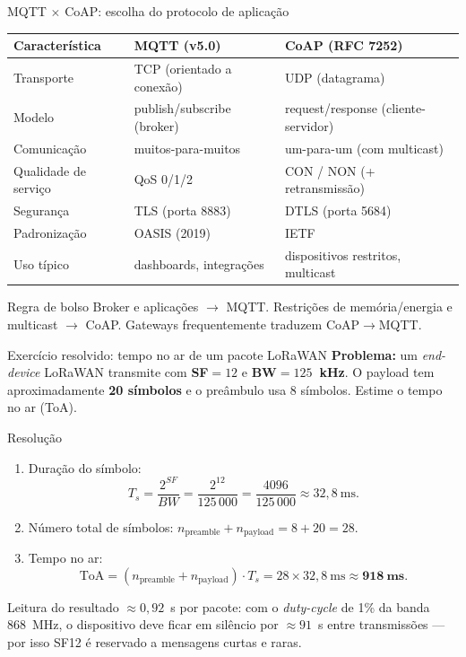 \documentclass[aspectratio=169,11pt]{beamer}
\begin{document}
\begin{frame}{MQTT $\times$ CoAP: escolha do protocolo de aplicação}
  \begin{center}
    \scriptsize
    \setlength{\tabcolsep}{4pt}
    \renewcommand{\arraystretch}{1.3}
    \begin{tabular}{p{3.2cm}p{4.6cm}p{4.6cm}}
      \toprule
      \textbf{Característica} & \textbf{MQTT (v5.0)} & \textbf{CoAP (RFC 7252)}\\
      \midrule
      Transporte & TCP (orientado a conexão) & UDP (datagrama)\\
      Modelo & publish/subscribe (broker) & request/response (cliente-servidor)\\
      Comunicação & muitos-para-muitos & um-para-um (com multicast)\\
      Qualidade de serviço & QoS 0/1/2 & CON / NON (+ retransmissão)\\
      Segurança & TLS (porta 8883) & DTLS (porta 5684)\\
      Padronização & OASIS (2019) & IETF\\
      Uso típico & dashboards, integrações & dispositivos restritos, multicast\\
      \bottomrule
    \end{tabular}
  \end{center}
  \pause
  \begin{alertblock}{Regra de bolso}
    Broker e aplicações $\rightarrow$ MQTT. Restrições de memória/energia e multicast $\rightarrow$ CoAP. Gateways frequentemente traduzem CoAP$\rightarrow$MQTT.
  \end{alertblock}
\end{frame}

\begin{frame}{Exercício resolvido: tempo no ar de um pacote LoRaWAN}
  \textbf{Problema:} um \emph{end-device} LoRaWAN transmite com \textbf{SF$=12$} e \textbf{BW$=125$~kHz}. O payload tem aproximadamente \textbf{20 símbolos} e o preâmbulo usa 8 símbolos. Estime o tempo no ar (ToA).
  \begin{block}{Resolução}
    \begin{enumerate}
      \item Duração do símbolo:
        \[
          T_s = \frac{2^{SF}}{BW} = \frac{2^{12}}{125\,000} = \frac{4096}{125\,000} \approx 32,8~\text{ms}.
        \]
      \item Número total de símbolos: $n_{\text{preamble}} + n_{\text{payload}} = 8 + 20 = 28$.
      \item Tempo no ar:
        \[
          \text{ToA} = (n_{\text{preamble}} + n_{\text{payload}}) \cdot T_s = 28 \times 32,8~\text{ms} \approx \mathbf{918~\text{ms}}.
        \]
    \end{enumerate}
  \end{block}
  \begin{alertblock}{Leitura do resultado}
    $\approx 0,92$~s por pacote: com o \emph{duty-cycle} de 1\% da banda 868~MHz, o dispositivo deve ficar em silêncio por $\approx 91$~s entre transmissões --- por isso SF12 é reservado a mensagens curtas e raras.
  \end{alertblock}
\end{frame}
\end{document}
